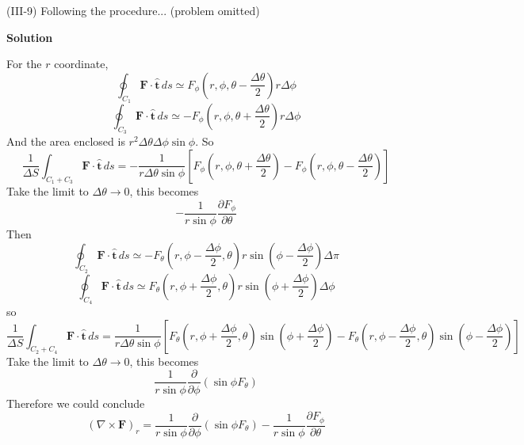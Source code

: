 \documentclass{article}
\begin{document}
\begin{homeworkProblem}
	(III-9) Following the procedure... (problem omitted)

	\textbf{Solution}

	For the $r$ coordinate,
	\[
		\oint_{C_1}\mathbf{F}\cdot\hat{\mathbf{t}}\,ds\simeq F_\phi\left(r,\phi,\theta-\frac{\Delta\theta}{2}\right)r\Delta\phi
	\]
	\[
		\oint_{C_3}\mathbf{F}\cdot\hat{\mathbf{t}}\,ds\simeq-F_\phi\left(r,\phi,\theta+\frac{\Delta\theta}{2}\right)r\Delta\phi
	\]
	And the area enclosed is $r^2\Delta\theta\Delta\phi\sin\phi$. So
	\[
		\frac{1}{\Delta S}\int_{C_1+C_3}\mathbf{F}\cdot\hat{\mathbf{t}}\,ds=-\frac{1}{r\Delta\theta\sin\phi}\left[F_\phi\left(r,\phi,\theta+\frac{\Delta\theta}{2}\right)-F_\phi\left(r,\phi,\theta-\frac{\Delta\theta}{2}\right)\right]
	\]
	Take the limit to $\Delta\theta\rightarrow0$, this becomes
	\[
		-\frac{1}{r\sin\phi}\frac{\partial F_\phi}{\partial\theta}
	\]
	Then
	\[
		\oint_{C_2}\mathbf{F}\cdot\hat{\mathbf{t}}\,ds\simeq-F_\theta\left(r,\phi-\frac{\Delta\phi}{2},\theta\right)r\sin\left(\phi-\frac{\Delta\phi}{2}\right)\Delta\pi
	\]
	\[
		\oint_{C_4}\mathbf{F}\cdot\hat{\mathbf{t}}\,ds\simeq F_\theta\left(r,\phi+\frac{\Delta\phi}{2},\theta\right)r\sin\left(\phi+\frac{\Delta\phi}{2}\right)\Delta\phi
	\]
	so
	\[
		\frac{1}{\Delta S}\int_{C_2+C_4}\mathbf{F}\cdot\hat{\mathbf{t}}\,ds=\frac{1}{r\Delta\theta\sin\phi}\left[F_\theta\left(r,\phi+\frac{\Delta\phi}{2},\theta\right)\sin\left(\phi+\frac{\Delta\phi}{2}\right)-F_\theta\left(r,\phi-\frac{\Delta\phi}{2},\theta\right)\sin\left(\phi-\frac{\Delta\phi}{2}\right)\right]
	\]
	Take the limit to $\Delta\theta\rightarrow0$, this becomes
	\[
		\frac{1}{r\sin\phi}\frac{\partial}{\partial\phi}(\sin\phi F_\theta)
	\]
	Therefore we could conclude
	\[
		(\nabla\times\mathbf{F})_r=\frac{1}{r\sin\phi}\frac{\partial}{\partial\phi}(\sin\phi F_\theta)-\frac{1}{r\sin\phi}\frac{\partial F_\phi}{\partial\theta}
	\]


\end{homeworkProblem}
\end{document}
